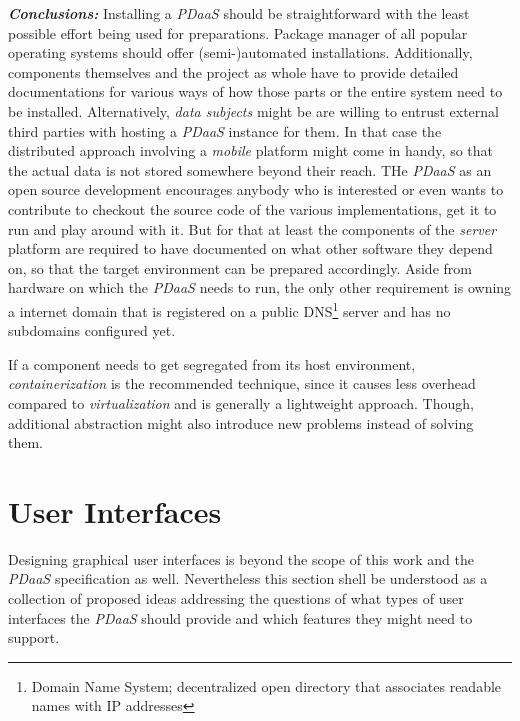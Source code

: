 \documentclass[12pt,english,a4paper,titlepage,cleardoublepage=empty,dottedtoc]{report}
\begin{document}
\emph{\textbf{Conclusions:}} Installing a \emph{PDaaS} should be
straightforward with the least possible effort being used for
preparations. Package manager of all popular operating systems should
offer (semi-)automated installations. Additionally, components
themselves and the project as whole have to provide detailed
documentations for various ways of how those parts or the entire system
need to be installed. Alternatively, \emph{data subjects} might be are
willing to entrust external third parties with hosting a \emph{PDaaS}
instance for them. In that case the distributed approach involving a
\emph{mobile} platform might come in handy, so that the actual data is
not stored somewhere beyond their reach. THe \emph{PDaaS} as an open
source development encourages anybody who is interested or even wants to
contribute to checkout the source code of the various implementations,
get it to run and play around with it. But for that at least the
components of the \emph{server} platform are required to have documented
on what other software they depend on, so that the target environment
can be prepared accordingly. Aside from hardware on which the
\emph{PDaaS} needs to run, the only other requirement is owning a
internet domain that is registered on a public DNS\footnote{Domain Name
  System; decentralized open directory that associates readable names
  with IP addresses} server and has no subdomains configured yet.

If a component needs to get segregated from its host environment,
\emph{containerization} is the recommended technique, since it causes
less overhead compared to \emph{virtualization} and is generally a
lightweight approach. Though, additional abstraction might also
introduce new problems instead of solving them.

\section{User Interfaces}\label{user-interfaces}

Designing graphical user interfaces is beyond the scope of this work and
the \emph{PDaaS} specification as well. Nevertheless this section shell
be understood as a collection of proposed ideas addressing the questions
of what types of user interfaces the \emph{PDaaS} should provide and
which features they might need to support.
\end{document}
